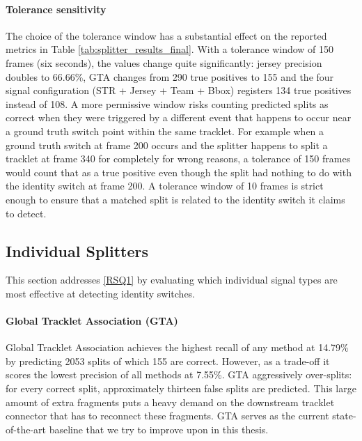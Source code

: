 \paragraph{Tolerance sensitivity}
The choice of the tolerance window has a substantial effect on the reported metrics in Table \ref{tab:splitter_results_final}. With a tolerance window of 150 frames (six seconds), the values change quite significantly: jersey precision doubles to 66.66\%, GTA changes from 290 true positives to 155 and the four signal configuration (STR + Jersey + Team + Bbox) registers 134 true positives instead of 108. A more permissive window risks counting predicted splits as correct when they were triggered by a different event  that happens to occur near a  ground truth  switch point within the same tracklet. For example when a ground truth switch at frame 200 occurs and the  splitter happens to split a tracklet at frame 340 for completely for wrong reasons, a tolerance of 150 frames would count that as a true positive even though the split had nothing to do with the identity switch at frame 200. A tolerance window of 10 frames is strict enough to ensure that a matched split is related to the identity switch it claims  to detect. 



\subsection{Individual Splitters}\label{subsec:individual_splitters}
This section addresses \ref{RSQ1} by evaluating which individual signal types are most effective at detecting identity switches.
\

\paragraph{Global Tracklet Association (GTA)}
Global Tracklet Association achieves the highest recall of any method at 14.79\% by predicting 2053 splits of which 155 are correct. However, as a trade-off it scores the lowest precision of all methods at 7.55\%. GTA aggressively over-splits: for every correct split, approximately thirteen false splits are predicted. This large amount of extra fragments puts a heavy demand on the downstream tracklet connector that has to reconnect these fragments. GTA serves as the current state-of-the-art baseline that we try to improve upon in this thesis.  



